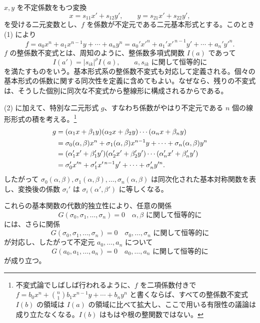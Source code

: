 \(x,y\) を不定係数をもつ変換
\begin{equation}
        x=s_{11}x'+s_{12}y',\qquad y=s_{21}x'+s_{22}y',
\end{equation}
を受ける二元変数とし、\(f\) を係数が不定元である二元基本形式とする。このとき (1) により
\begin{equation}
        f=a_0x^n+a_1x^{n-1}y+\cdots+a_ny^n
        =a_0'x'^n+a_1'x'^{\,n-1}y'+\cdots+a_n'y'^n.
\end{equation}
\(f\) の整係数不変式とは、周知のように、整係数多項式関数 \(I(a)\) であって
\begin{equation}
        I(a')=|s_{ik}|^\rho I(a),\qquad \text{\(a,s_{ik}\) に関して恒等的に}
\end{equation}
を満たすものをいう。基本形式系の整係数不変式も対応して定義される。個々の基本形式の係数に関する同次性を定義に含めてもよい。なぜなら、残りの不変式は、そうした個別に同次な不変式から整線形に構成されるからである。

(2) に加えて、特別な二元形式 \(g\)、すなわち係数がやはり不定元である \(n\) 個の線形形式の積を考える。\footnote{不変式論でしばしば行われるように、\(f\) を二項係数付きで \(f=b_0x^n+\binom n1b_1x^{n-1}y+\cdots+b_ny^n\) と書くならば、すべての整係数不変式 \(I(b)\) の領域は \(I(a)\) の領域に比べて拡大し、ここで用いる有限性の議論は成り立たなくなる。\(I(b)\) はもはや根の整関数ではない。}
\begin{align}
        g&=(\alpha_1x+\beta_1y)(\alpha_2x+\beta_2y)\cdots(\alpha_nx+\beta_ny)\notag\\
         &=\sigma_0(\alpha,\beta)x^n+\sigma_1(\alpha,\beta)x^{n-1}y+\cdots+\sigma_n(\alpha,\beta)y^n\notag\\
         &=(\alpha_1'x'+\beta_1'y')(\alpha_2'x'+\beta_2'y')\cdots(\alpha_n'x'+\beta_n'y')\notag\\
         &=\sigma_0'x'^n+\sigma_1'x'^{\,n-1}y'+\cdots+\sigma_n'y'^n.
\end{align}
したがって \(\sigma_0(\alpha,\beta),\sigma_1(\alpha,\beta),\ldots,\sigma_n(\alpha,\beta)\) は同次化された基本対称関数を表し、変換後の係数 \(\sigma_i'\) は \(\sigma_i(\alpha',\beta')\) に等しくなる。

これらの基本関数の代数的独立性により、任意の関係
\begin{equation}
        G(\sigma_0,\sigma_1,\ldots,\sigma_n)=0
        \quad \text{\(\alpha,\beta\) に関して恒等的に}
\end{equation}
には、さらに関係
\begin{equation}
        G(\sigma_0,\sigma_1,\ldots,\sigma_n)=0
        \quad \text{\(\sigma_0,\ldots,\sigma_n\) に関して恒等的に}
\end{equation}
が対応し、したがって不定元 \(a_0,\ldots,a_n\) について
\begin{equation}
        G(a_0,a_1,\ldots,a_n)=0
        \quad \text{\(a_0,\ldots,a_n\) に関して恒等的に}
\end{equation}
が成り立つ。


